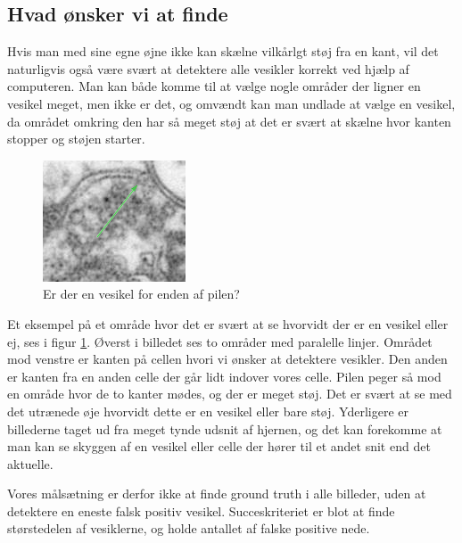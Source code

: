 \subsection{Hvad ønsker vi at finde}
Hvis man med sine egne øjne ikke kan skælne vilkårlgt støj fra en kant, vil det naturligvis også være svært at detektere alle vesikler korrekt ved hjælp af computeren. Man kan både komme til at vælge nogle områder der ligner en vesikel meget, men ikke er det, og omvændt kan man undlade at vælge en vesikel, da området omkring den har så meget støj at det er svært at skælne hvor kanten stopper og støjen starter. 

\begin{figure}[H]
	\centering
	\includegraphics[scale=1.5]{files/intro/img/celle_questionves.png}
	\caption{Er der en vesikel for enden af pilen?\label{fig:intro_celle_question}}
\end{figure}

Et eksempel på et område hvor det er svært at se hvorvidt der er en vesikel eller ej, ses i figur \ref{fig:intro_celle_question}. Øverst i billedet ses to områder med paralelle linjer. Området mod venstre er kanten på cellen hvori vi ønsker at detektere vesikler. Den anden er kanten fra en anden celle der går lidt indover vores celle. Pilen peger så mod en område hvor de to kanter mødes, og der er meget støj. Det er svært at se med det utrænede øje hvorvidt dette er en vesikel eller bare støj. Yderligere er billederne taget ud fra meget tynde udsnit af hjernen, og det kan forekomme at man kan se skyggen af en vesikel eller celle der hører til et andet snit end det aktuelle.  

Vores målsætning er derfor ikke at finde ground truth i alle billeder, uden at detektere en eneste falsk positiv vesikel. Succeskriteriet er blot at finde størstedelen af vesiklerne, og holde antallet af falske positive nede.   



